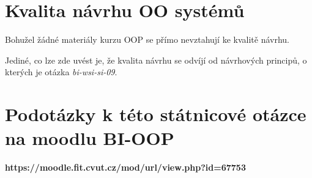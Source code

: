 \documentclass{szzclass}
\begin{document}
\tableofcontents
\newpage

\section{Kvalita návrhu OO systémů}

Bohužel žádné materiály kurzu OOP se přímo nevztahují ke kvalitě návrhu.

Jediné, co lze zde uvést je, že kvalita návrhu se odvíjí od návrhových principů, o kterých je otázka
\textit{bi-wsi-si-09}.

\section{Podotázky k této státnicové otázce na moodlu BI-OOP}

\textbf{https://moodle.fit.cvut.cz/mod/url/view.php?id=67753}
\end{document}
